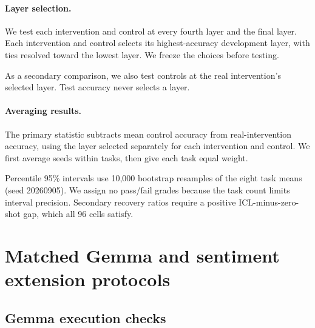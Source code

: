 \documentclass[11pt]{article}
\begin{document}
\paragraph{Layer selection.} We test each intervention and control at every fourth layer and the final layer. Each intervention and control selects its highest-accuracy development layer, with ties resolved toward the lowest layer. We freeze the choices before testing.

As a secondary comparison, we also test controls at the real intervention's selected layer. Test accuracy never selects a layer.

\paragraph{Averaging results.} The primary statistic subtracts mean control accuracy from real-intervention accuracy, using the layer selected separately for each intervention and control. We first average seeds within tasks, then give each task equal weight.

Percentile 95\% intervals use 10,000 bootstrap resamples of the eight task means (seed 20260905). We assign no pass/fail grades because the task count limits interval precision. Secondary recovery ratios require a positive ICL-minus-zero-shot gap, which all 96 cells satisfy.

\section{Matched Gemma and sentiment extension protocols}
\label{sec:extension-protocol}

\begin{table}[t]
  \centering
  \small
  
  \caption{Gemma TV accuracy (\%), averaged over three seeds. Controls average three shuffled TVs with independently selected layers.}
  \label{tab:gemma-tasks}
\end{table}

\begin{table}[t]
  \centering
  \small
  \setlength{\tabcolsep}{4pt}
  
  \caption{Sentiment accuracy (\%), averaged over seeds. $\Delta$: TV minus shuffled controls (percentage points), with stratified input-bootstrap 95\% CIs. Constant: seeds predicting one token throughout.}
  \label{tab:sentiment-full}
\end{table}

\subsection{Gemma execution checks}
\end{document}
